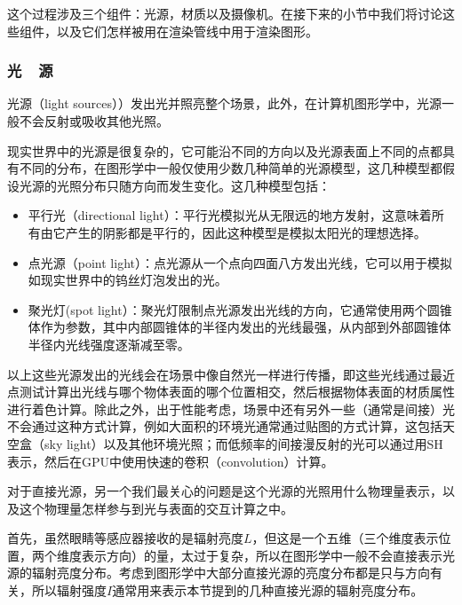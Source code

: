这个过程涉及三个组件：光源，材质以及摄像机。在接下来的小节中我们将讨论这些组件，以及它们怎样被用在渲染管线中用于渲染图形。




\subsubsection{光~~源}\label{sec:intro-light-sources}
光源（light sources））发出光并照亮整个场景，此外，在计算机图形学中，光源一般不会反射或吸收其他光照。

现实世界中的光源是很复杂的，它可能沿不同的方向以及光源表面上不同的点都具有不同的分布，在图形学中一般仅使用少数几种简单的光源模型，这几种模型都假设光源的光照分布只随方向而发生变化。这几种模型包括：

\begin{itemize}
	\item 平行光（directional light）：平行光模拟光从无限远的地方发射，这意味着所有由它产生的阴影都是平行的，因此这种模型是模拟太阳光的理想选择。
	\item 点光源（point light）：点光源从一个点向四面八方发出光线，它可以用于模拟如现实世界中的钨丝灯泡发出的光。
	\item 聚光灯(spot light）：聚光灯限制点光源发出光线的方向，它通常使用两个圆锥体作为参数，其中内部圆锥体的半径内发出的光线最强，从内部到外部圆锥体半径内光线强度逐渐减至零。
\end{itemize}


以上这些光源发出的光线会在场景中像自然光一样进行传播，即这些光线通过最近点测试计算出光线与哪个物体表面的哪个位置相交，然后根据物体表面的材质属性进行着色计算。除此之外，出于性能考虑，场景中还有另外一些（通常是间接）光不会通过这种方式计算，例如大面积的环境光通常通过贴图的方式计算，这包括天空盒（sky light）以及其他环境光照；而低频率的间接漫反射的光可以通过用SH表示，然后在GPU中使用快速的卷积（convolution）计算。


对于直接光源，另一个我们最关心的问题是这个光源的光照用什么物理量表示，以及这个物理量怎样参与到光与表面的交互计算之中。

首先，虽然眼睛等感应器接收的是辐射亮度$L$，但这是一个五维（三个维度表示位置，两个维度表示方向）的量，太过于复杂，所以在图形学中一般不会直接表示光源的辐射亮度分布。考虑到图形学中大部分直接光源的亮度分布都是只与方向有关，所以辐射强度$I$通常用来表示本节提到的几种直接光源的辐射亮度分布。

